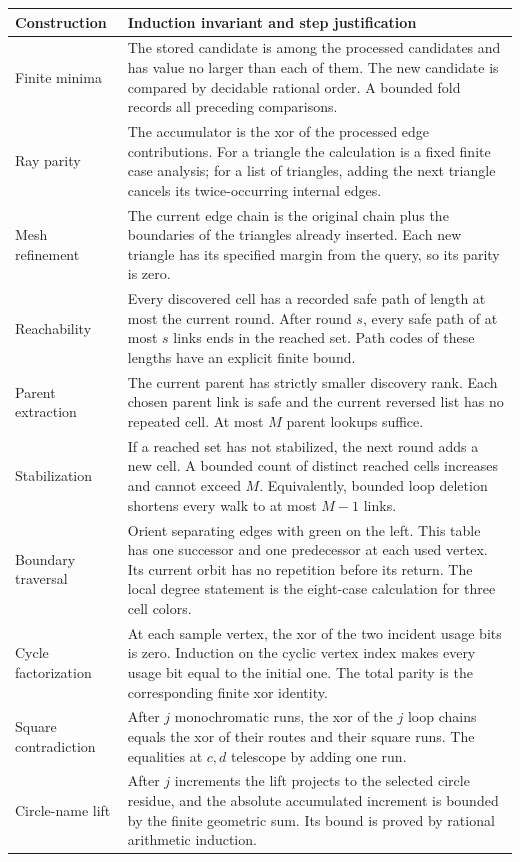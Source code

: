 \begin{longtable}{@{}p{}p{}@{}}
\toprule
Construction & Induction invariant and step justification\\
\midrule
\endhead
Finite minima &
The stored candidate is among the processed candidates and has
value no larger than each of them. The new candidate is compared
by decidable rational order. A bounded fold records all preceding
comparisons.\\[3pt]
Ray parity &
The accumulator is the xor of the processed edge contributions.
For a triangle the calculation is a fixed finite case analysis;
for a list of triangles, adding the next triangle cancels its
twice-occurring internal edges.\\[3pt]
Mesh refinement &
The current edge chain is the original chain plus the boundaries
of the triangles already inserted. Each new triangle has its
specified margin from the query, so its parity is zero.\\[3pt]
Reachability &
Every discovered cell has a recorded safe path of length at
most the current round. After round $s$, every safe path of at
most $s$ links ends in the reached set. Path codes of these
lengths have an explicit finite bound.\\[3pt]
Parent extraction &
The current parent has strictly smaller discovery rank.
Each chosen parent link is safe and the current reversed list
has no repeated cell. At most $M$ parent lookups suffice.\\[3pt]
Stabilization &
If a reached set has not stabilized, the next round adds a
new cell. A bounded count of distinct reached cells increases
and cannot exceed $M$. Equivalently, bounded loop deletion
shortens every walk to at most $M-1$ links.\\[3pt]
Boundary traversal &
Orient separating edges with green on the left. This table has
one successor and one predecessor at each used vertex. Its current orbit has no
repetition before its return. The local degree statement is
the eight-case calculation for three cell colors.\\[3pt]
Cycle factorization &
At each sample vertex, the xor of the two incident usage bits
is zero. Induction on the cyclic vertex index makes every
usage bit equal to the initial one. The total parity is the
corresponding finite xor identity.\\[3pt]
Square contradiction &
After $j$ monochromatic runs, the xor of the $j$ loop chains
equals the xor of their routes and their square runs.
The equalities at $c,d$ telescope by adding one run.\\[3pt]
Circle-name lift &
After $j$ increments the lift projects to the selected
circle residue, and the absolute accumulated increment is
bounded by the finite geometric sum. Its bound is proved
by rational arithmetic induction.\\
\bottomrule
\end{longtable}


